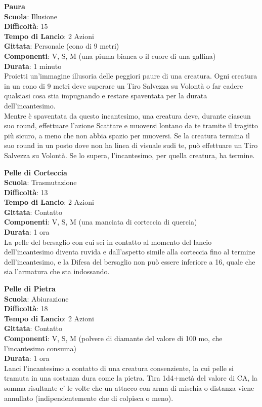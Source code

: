 \begin{multicols}{2}
\medskip\textbf{Paura}\\
\textbf{Scuola}: Illusione\\
\textbf{Difficoltà}:  15\\
\textbf{Tempo di Lancio}: 2 Azioni\\
\textbf{Gittata}: Personale (cono di 9 metri)\\
\textbf{Componenti}: V, S, M (una piuma bianca o il cuore di una gallina)\\
\textbf{Durata}: 1 minuto\\
Proietti un'immagine illusoria delle peggiori paure di una creatura. Ogni creatura in un cono di 9 metri deve superare un Tiro Salvezza su Volontà o far cadere qualsiasi cosa stia impugnando e restare spaventata per la durata dell'incantesimo.\\
Mentre è spaventata da questo incantesimo, una creatura deve, durante ciascun suo round, effettuare l’azione Scattare e muoversi lontano da te tramite il tragitto più sicuro, a meno che non abbia spazio per muoversi. Se la creatura termina il suo round in un posto dove non ha linea di visuale sudi te, può effettuare un  Tiro Salvezza su Volontà. Se lo supera, l'incantesimo, per quella creatura, ha termine. 

\medskip\textbf{Pelle di Corteccia}\\
\textbf{Scuola}: Trasmutazione\\
\textbf{Difficoltà}:  13\\
\textbf{Tempo di Lancio}: 2 Azioni\\
\textbf{Gittata}: Contatto\\
\textbf{Componenti}: V, S, M (una manciata di corteccia di quercia)\\
\textbf{Durata}: 1 ora\\
La pelle del bersaglio con cui sei in contatto al momento del lancio dell'incantesimo diventa ruvida e dall'aspetto simile alla corteccia fino al termine dell'incantesimo, e la Difesa del bersaglio non può essere inferiore a 16, quale che sia l’armatura che sta indossando.

\medskip\textbf{Pelle di Pietra}\\
\textbf{Scuola}: Abiurazione\\
\textbf{Difficoltà}:  18\\
\textbf{Tempo di Lancio}: 2 Azioni\\
\textbf{Gittata}: Contatto\\
\textbf{Componenti}: V, S, M (polvere di diamante del valore di 100 mo, che l'incantesimo consuma)\\
\textbf{Durata}: 1 ora\\
Lanci l'incantesimo a contatto di una creatura consenziente, la cui pelle si tramuta in una sostanza dura come la pietra. Tira 1d4+metà del valore di CA, la somma risultante e' le volte che un attacco con arma di mischia o distanza viene annullato (indipendentemente che di colpisca o meno).\\


\end{multicols}
